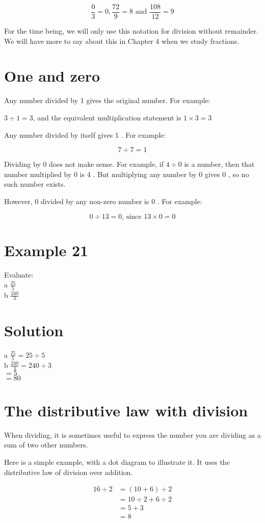 \documentclass[10pt]{article}
\begin{document}
\[
\frac{0}{3}=0, \frac{72}{9}=8 \text { and } \frac{108}{12}=9
\]

For the time being, we will only use this notation for division without remainder. We will have more to say about this in Chapter 4 when we study fractions.

\section*{One and zero}
Any number divided by 1 gives the original number. For example:

\(3 \div 1=3\), and the equivalent multiplication statement is \(1 \times 3=3\)

Any number divided by itself gives 1 . For example:

\[
7 \div 7=1
\]

Dividing by 0 does not make sense. For example, if \(4 \div 0\) is a number, then that number multiplied by 0 is 4 . But multiplying any number by 0 gives 0 , so no such number exists.

However, 0 divided by any non-zero number is 0 . For example:

\[
0 \div 13=0 \text {, since } 13 \times 0=0
\]

\section*{Example 21}
Evaluate:\\
a \(\frac{25}{5}\)\\
b \(\frac{240}{3}\)

\section*{Solution}
a \(\frac{25}{5}=25 \div 5\)\\
b \(\frac{240}{3}=240 \div 3\)\\
\(=5\)\\
\(=80\)

\section*{The distributive law with division}
When dividing, it is sometimes useful to express the number you are dividing as a sum of two other numbers.

Here is a simple example, with a dot diagram to illustrate it. It uses the distributive law of division over addition.

\[
\begin{aligned}
16 \div 2 & =(10+6) \div 2 \\
& =10 \div 2+6 \div 2 \\
& =5+3 \\
& =8
\end{aligned}
\]
\end{document}
